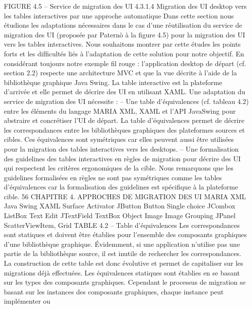 \documentclass{article}
\begin{document}
 
FIGURE 4.5 – Service de migration des UI
4.3.1.4
Migration des UI desktop vers les tables interactives par une approche automatique
Dans cette section nous \'{e}tudions les adaptations n\'{e}cessaires dans le cas d’une r\'{e}utilisation du
service de migration des UI (propos\'{e}e par Paternò \`{a} la ﬁgure 4.5) pour la migration des UI vers les
tables interactives. Nous souhaitons montrer par cette \'{e}tudes les points forts et les difﬁcult\'{e}s li\'{e}s \`{a}
l’adaptation de cette solution pour notre objectif. En consid\'{e}rant toujours notre exemple ﬁl rouge :
l’application desktop de d\'{e}part (cf. section 2.2) respecte une architecture MVC et que la vue d\'{e}crite
\`{a} l’aide de la biblioth\`{e}que graphique Java Swing. La table interactive est la plateforme d’arriv\'{e}e et
elle permet de d\'{e}crire des UI en utilisant XAML. Une adaptation du service de migration des UI
n\'{e}cessite :
– Une table d’\'{e}quivalences (cf. tableau 4.2) entre les \'{e}l\'{e}ments du langage MARIA XML, XAML
et l’API JavaSwing pour abstraire et concr\'{e}tiser l’UI de d\'{e}part. La table d’\'{e}quivalences permet
de d\'{e}crire les correspondances entre les biblioth\`{e}ques graphiques des plateformes sources et
cibles. Ces \'{e}quivalences sont sym\'{e}triques car elles peuvent aussi \^{e}tre utilis\'{e}es pour la migration
des tables interactives vers les desktops.
– Une formalisation des guidelines des tables interactives en r\`{e}gles de migration pour d\'{e}crire des
UI qui respectent les crit\`{e}res ergonomiques de la cible. Nous remarquons que les guidelines formalis\'{e}es en r\`{e}gles ne sont pas sym\'{e}triques comme les tables d’\'{e}quivalences car la formalisation
des guidelines est sp\'{e}ciﬁque \`{a} la plateforme cible.
56
CHAPITRE 4. APPROCHES DE MIGRATION DES UI
MARIA XML
Java Swing
XAML Surface
Activator
JButton
Button
Single choice
JCombox
ListBox
Text Edit
JTextField
TextBox
Object
Image
Image
Grouping
JPanel
ScatterViewItem, Grid
TABLE 4.2 – Table d’\'{e}quivalences
Les correspondances sont statiques et doivent \^{e}tre \'{e}tablies pour l’ensemble des composants graphiques d’une biblioth\`{e}que graphique. Évidemment, si une application n’utilise pas une partie de la
biblioth\`{e}que source, il est inutile de rechercher les correspondances. La construction de cette table est
donc \'{e}volutive et permet de capitaliser sur les migrations d\'{e}j\`{a} effectu\'{e}es. Les \'{e}quivalences statiques
sont \'{e}tablies en se basant sur les types des composants graphiques. Cependant le processus de migration se basant sur les instances des composants graphiques, chaque instance peut impl\'{e}menter ou
\end{document}
